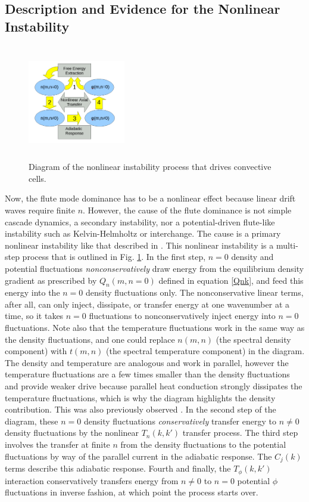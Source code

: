 \documentclass[showpacs,preprintnumbers,amsmath,amssymb,superscriptaddress]{revtex4}
\begin{document}
\subsection{Description and Evidence for the Nonlinear Instability}

\begin{figure}
\includegraphics[width=0.38\textwidth,height=50mm]{nl_instability_diagram}
\hfil
\caption{Diagram of the nonlinear instability process that drives convective cells.}
\label{nl_instability_diagram}
\end{figure}

Now, the flute mode dominance has to be a nonlinear effect because linear drift waves require finite $n$. However, the cause of the flute dominance is not simple cascade dynamics, a secondary 
instability, nor a potential-driven flute-like instability such as Kelvin-Helmholtz or interchange. The cause is a primary nonlinear instability like that described in \cite{biskamp1995,drake1995}. 
This nonlinear instability is a multi-step process that is outlined in Fig. \ref{nl_instability_diagram}.
In the first step, $n=0$ density and potential fluctuations \emph{nonconservatively} draw energy from the equilibrium density gradient as prescribed by $Q_n(m,n=0)$ defined in equation \ref{Qnk}, and feed
this energy into the $n=0$ density fluctuations only. The nonconservative linear terms, after all, can only inject, dissipate, or transfer energy at one wavenumber at a time, so it takes
$n=0$ fluctuations to nonconservatively inject energy into $n=0$ fluctuations.
Note also that the temperature fluctuations work in the same way as the density fluctuations, and one could replace $n(m,n)$ (the spectral density component)
with $t(m,n)$ (the spectral temperature component) in the diagram. The density and temperature are analogous and work in parallel, however the temperature fluctuations are a few times smaller
than the density fluctuations and provide weaker drive because parallel heat conduction strongly dissipates the temperature fluctuations, which is why the diagram highlights the density contribution.
This was also previously observed \cite{zeiler1997}.
In the second step of the diagram, these $n=0$ density fluctuations
\emph{conservatively} transfer energy to $n \ne 0$ density fluctuations by the nonlinear $T_n(k,k')$ transfer process. The third step involves the transfer at finite $n$ from the density
fluctuations to the potential fluctuations by way of the parallel current in the adiabatic response. The $C_j(k)$ terms describe this adiabatic response.
Fourth and finally, the $T_\phi(k,k')$ interaction conservatively transfers energy from
$n \ne 0$ to $n=0$ potential $\phi$ fluctuations in inverse fashion, at which point the process starts over. 
\end{document}
